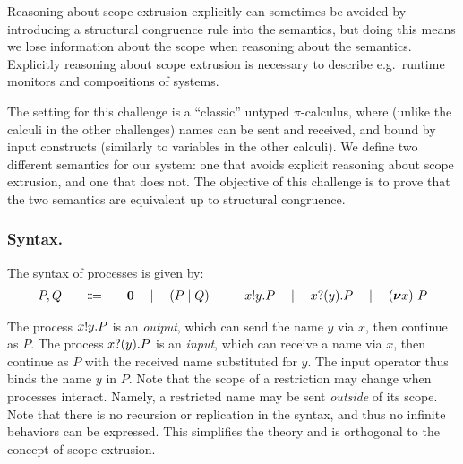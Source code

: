 \documentclass[runningheads]{llncs}
\begin{document}
Reasoning about scope extrusion explicitly can sometimes be avoided by introducing a structural congruence rule into the semantics, but doing this means we lose information about the scope when reasoning about the semantics.
Explicitly reasoning about scope extrusion is necessary to describe e.g.\ runtime monitors and compositions of systems.

The setting for this challenge is a ``classic'' untyped \( \pi \)-calculus, where (unlike the calculi in the other challenges) names can be sent and received, and bound by input constructs (similarly to variables in the other calculi).
We define two different semantics for our system: one that avoids explicit reasoning about scope extrusion, and one that does not.
The objective of this challenge is to prove that the two semantics are equivalent up to structural congruence.

\subsubsection{Syntax.}
The syntax of processes is given by:
\[
\begin{array}{r@{\qquad}c@{\qquad}l}
  P,Q & \Coloneqq & \Pend \quad\mid\quad \PBpar{P}{Q} \quad\mid\quad \Pout{x}{y}{P} \quad\mid\quad \Pin{x}{y}{P} \quad\mid\quad \Pres{x}{P}
\end{array}
\]


The process \( x ! y . P \) is an \emph{output}, which can send the name \( y \) via \( x \), then continue as \( P \).
The process \( x ? (y) . P \) is an \emph{input}, which can receive a name via \( x \), then continue as \( P \) with the received name substituted for \( y \).
The input operator thus binds the name \( y \) in \( P \).
Note that the scope of a restriction may change when processes interact. Namely, a restricted name may be sent \emph{outside} of its scope.
Note that there is no recursion or replication in the syntax, and thus no infinite behaviors can be expressed.
This simplifies the theory and is orthogonal to the concept of scope extrusion.
\end{document}
